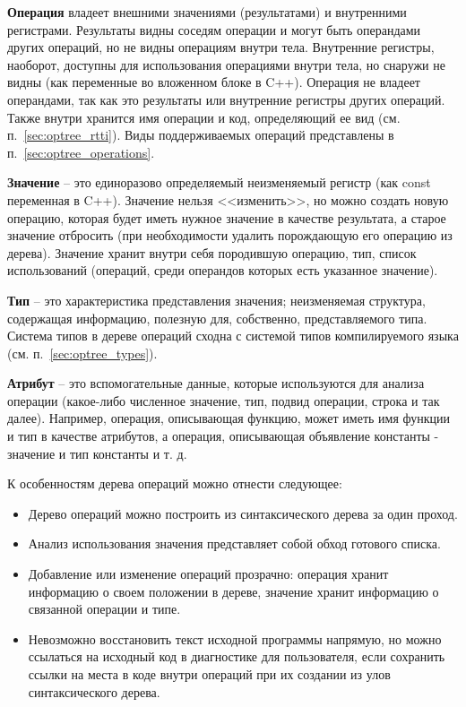 \textbf{Операция} владеет внешними значениями (результатами) и внутренними регистрами.
Результаты видны соседям операции и могут быть операндами других операций, но не видны операциям внутри тела.
Внутренние регистры, наоборот, доступны для использования операциями внутри тела, но снаружи не видны (как переменные во вложенном блоке в C++).
Операция не владеет операндами, так как это результаты или внутренние регистры других операций.
Также внутри хранится имя операции и код, определяющий ее вид (см. п.~\ref{sec:optree_rtti}).
Виды поддерживаемых операций представлены в п.~\ref{sec:optree_operations}.

\textbf{Значение} -- это единоразово определяемый неизменяемый регистр (как const переменная в C++).
Значение нельзя <<изменить>>, но можно создать новую операцию, которая будет иметь нужное значение в качестве результата, а старое значение отбросить (при необходимости удалить порождающую его операцию из дерева).
Значение хранит внутри себя породившую операцию, тип, список использований (операций, среди операндов которых есть указанное значение).

\textbf{Тип} -- это характеристика представления значения; неизменяемая структура, содержащая информацию, полезную для, собственно, представляемого типа.
Система типов в дереве операций сходна с системой типов компилируемого языка (см. п.~\ref{sec:optree_types}).

\textbf{Атрибут} -- это вспомогательные данные, которые используются для анализа операции (какое-либо численное значение, тип, подвид операции, строка и так далее).
Например, операция, описывающая функцию, может иметь имя функции и тип в качестве атрибутов, а операция, описывающая объявление константы - значение и тип константы и т. д.

К особенностям дерева операций можно отнести следующее:

\begin{itemize}
    \item Дерево операций можно построить из синтаксического дерева за один проход.
    \item Анализ использования значения представляет собой обход готового списка.
    \item Добавление или изменение операций прозрачно: операция хранит информацию о своем положении в дереве, значение хранит информацию о связанной операции и типе.
    \item Невозможно восстановить текст исходной программы напрямую, но можно ссылаться на исходный код в диагностике для пользователя, если сохранить ссылки на места в коде внутри операций при их создании из улов синтаксического дерева.
\end{itemize}

